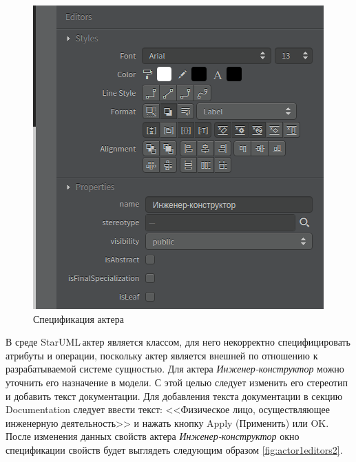 \documentclass[a4paper,12pt]{extreport}
\newcommand{\staruml}{StarUML\,\tm}
\begin{document}
\newpage
\begin{figure}[htbp]
	\centering
	\includegraphics[width=0.5\linewidth]{images/actor1editors}
	\caption{Спецификация актера}
	\label{fig:actor1editors}
\end{figure}

В среде \staruml актер является классом, для него некорректно специфицировать атрибуты и операции, поскольку актер является внешней по отношению к разрабатываемой системе сущностью.
Для актера \textit{Инженер-конструктор} можно уточнить его назначение в модели. С этой целью следует изменить его стереотип и добавить текст документации. Для добавления текста документации в секцию Documentation следует ввести текст: <<Физическое лицо, осуществляющее инженерную деятельность>> и нажать кнопку Apply (Применить) или OK. После изменения данных свойств актера \textit{Инженер-конструктор} окно спецификации свойств будет выглядеть следующим образом \ref{fig:actor1editors2}.
\end{document}
